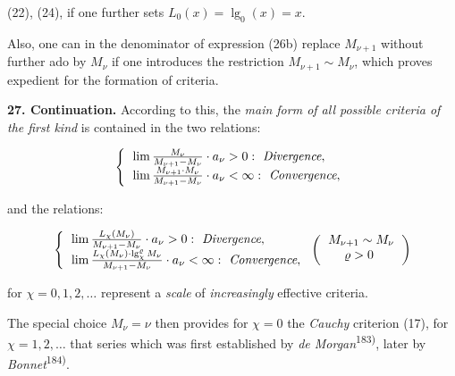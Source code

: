\thispagestyle{fancy}

\vspace{0.5cm}

(22), (24), if one further sets $L_0(x) = \lg_0(x) = x$.

Also, one can in the denominator of expression (26b) replace $M_{\nu+1}$ without further ado by $M_\nu$ if one introduces the restriction $M_{\nu+1} \sim M_\nu$, which proves expedient for the formation of criteria.

\vspace{0.3cm}
\textbf{27. Continuation.} According to this, the \textit{main form of all possible criteria of the first kind} is contained in the two relations:

\vspace{-0.5cm}
\begin{align}
    \left\{ 
    \begin{tabular}{l}
    $\lim \frac{M_\nu}{M_{\nu+1} - M_\nu} \cdot a_\nu > 0: \textit{ Divergence},$\\ 
    $\lim \frac{M_{\nu+1} \cdot M_\nu}{M_{\nu+1} - M_\nu} \cdot a_\nu < \infty: \textit{ Convergence},$
    \end{tabular}
    \right.
\end{align}
\vspace{-0.2cm}

and the relations:

\vspace{-0.5cm}
\begin{align}
    \left\{ 
    \begin{tabular}{l}
    $\lim \frac{L_\chi(M_\nu)}{M_{\nu+1} - M_\nu} \cdot a_\nu > 0: \textit{ Divergence},$\\ 
    $\lim \frac{L_\chi(M_{\nu}) \cdot \lg_{\chi}^{\varrho} M_\nu}{M_{\nu+1} - M_\nu} \cdot a_\nu < \infty: \textit{ Convergence},$
    \end{tabular}
    \right. \bigg(\raisebox{-1ex}{\begin{tabular}[b]{l} $M_{\nu+1} \sim M_\nu$ \\ $\quad \; \varrho > 0$ \end{tabular}}\bigg)
\end{align}
\vspace{-0.2cm}

for $\chi = 0, 1, 2, \ldots$ represent a \textit{scale} of \textit{increasingly} effective criteria.

The special choice $M_\nu = \nu$ then provides for $\chi = 0$ the \textit{Cauchy} criterion (17), for $\chi = 1, 2, \ldots$ that series which was first established by \textit{de Morgan}\textsuperscript{183)}, later by \textit{Bonnet}\textsuperscript{184)}.


